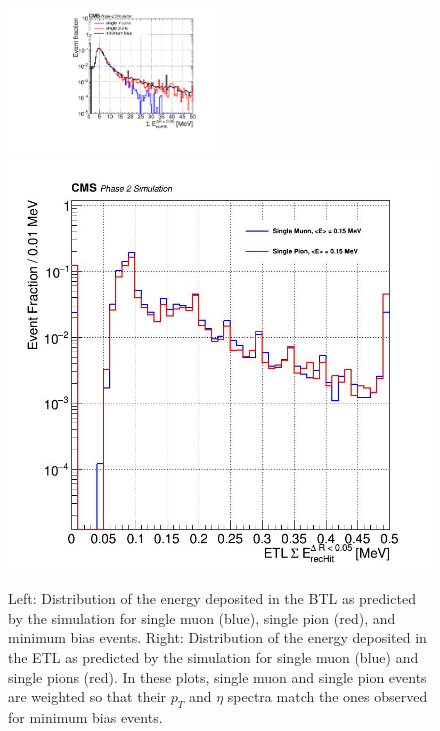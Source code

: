 \begin{figure}[hbtp]
\centering
\includegraphics[width=0.49\textwidth]{fig/performance/c_all_Edep.pdf}
\includegraphics[width=0.45\linewidth]{fig/performance/ETL_energyDeposition.png}
\caption{Left: Distribution of the energy deposited in the BTL as predicted by the simulation for single muon (blue), single pion (red), and minimum bias events. 
Right: Distribution of the energy deposited in the ETL as predicted by the simulation for single muon (blue) and single pions (red). 
In these plots, single muon and single pion events are weighted so that their $p_{T}$ and $\eta$ spectra match the ones observed for minimum bias events. 
}
\label{fig:BTL_Edep}
\end{figure}

